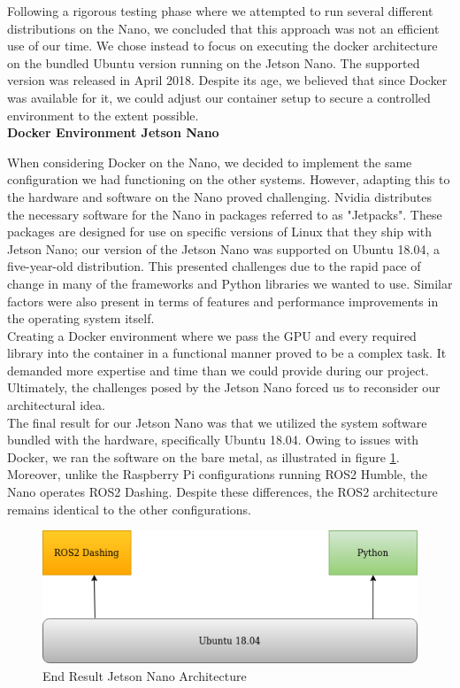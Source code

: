 Following a rigorous testing phase where we attempted to run several different distributions on the Nano, we concluded that this approach was not an efficient use of our time. We chose instead to focus on executing the docker architecture on the bundled Ubuntu version running on the Jetson Nano. The supported version was released in April 2018. Despite its age, we believed that since Docker was available for it, we could adjust our container setup to secure a controlled environment to the extent possible.\\

\textbf{Docker Environment Jetson Nano}

When considering Docker on the Nano, we decided to implement the same configuration we had functioning on the other systems. However, adapting this to the hardware and software on the Nano proved challenging. Nvidia distributes the necessary software for the Nano in packages referred to as "Jetpacks". These packages are designed for use on specific versions of Linux that they ship with Jetson Nano; our version of the Jetson Nano was supported on Ubuntu 18.04, a five-year-old distribution. This presented challenges due to the rapid pace of change in many of the frameworks and Python libraries we wanted to use. Similar factors were also present in terms of features and performance improvements in the operating system itself.\\

Creating a Docker environment where we pass the GPU and every required library into the container in a functional manner proved to be a complex task. It demanded more expertise and time than we could provide during our project. Ultimately, the challenges posed by the Jetson Nano forced us to reconsider our architectural idea.\\

The final result for our Jetson Nano was that we utilized the system software bundled with the hardware, specifically Ubuntu 18.04. Owing to issues with Docker, we ran the software on the bare metal, as illustrated in figure \ref{fig:jetsonnanoros}. Moreover, unlike the Raspberry Pi configurations running ROS2 Humble, the Nano operates ROS2 Dashing. Despite these differences, the ROS2 architecture remains identical to the other configurations.\\

\begin{figure}[H]
    \centering
    \includegraphics[scale=0.35]{fig/jetsonros.drawio.png}
    \caption{End Result Jetson Nano Architecture}
    \label{fig:jetsonnanoros}
\end{figure}
\newpage

